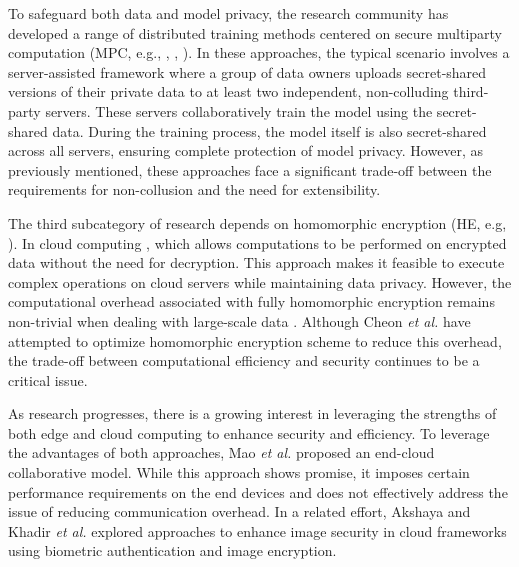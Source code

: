 \documentclass[conference]{IEEEtran}
\begin{document}
To safeguard both data and model privacy, the research community has developed a range of distributed training methods centered on secure multiparty computation (MPC, e.g., \cite{7958569}, \cite{Escudero2020ImprovedPF}, \cite{Dalskov2020FantasticFH}). In these approaches, the typical scenario involves a server-assisted framework where a group of data owners uploads secret-shared versions of their private data to at least two independent, non-colluding third-party servers. These servers collaboratively train the model using the secret-shared data. During the training process, the model itself is also secret-shared across all servers, ensuring complete protection of model privacy. However, as previously mentioned, these approaches face a significant trade-off between the requirements for non-collusion and the need for extensibility.

The third subcategory of research depends on homomorphic encryption (HE, e.g, \cite{Nandakumar2019TowardsDN,CiC-1-2-22,9888863,zhao2023identifiable}). In cloud computing \cite{gentry2009fully}, which allows computations to be performed on encrypted data without the need for decryption. This approach makes it feasible to execute complex operations on cloud servers while maintaining data privacy. However, the computational overhead associated with fully homomorphic encryption remains non-trivial when dealing with large-scale data \cite{xu2019cryptonn}. Although Cheon \textit{et al.} \cite{cheon2017homomorphic} have attempted to optimize homomorphic encryption scheme to reduce this overhead, the trade-off between computational efficiency and security continues to be a critical issue.

As research progresses, there is a growing interest in leveraging the strengths of both edge and cloud computing to enhance security and efficiency. To leverage the advantages of both approaches, Mao \textit{et al.} \cite{mao2017survey} proposed an end-cloud collaborative model. While this approach shows promise, it imposes certain performance requirements on the end devices and does not effectively address the issue of reducing communication overhead. In a related effort, Akshaya and Khadir \textit{et al.} \cite{kakkad2019biometric} explored approaches to enhance image security in cloud frameworks using biometric authentication and image encryption.

\end{document}
